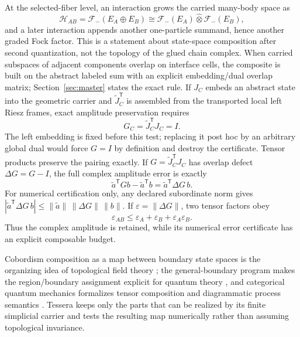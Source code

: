 \documentclass[11pt,letterpaper]{article}
\newcommand{\Fock}{\mathcal{F}_{-}}
\newcommand{\HK}{\mathcal{H}}
\newcommand{\gtens}{\mathbin{\widehat{\otimes}}}
\begin{document}
At the selected-fiber level, an interaction grows the carried many-body space
as
\begin{equation*}
  \HK_{AB}=\Fock(E_A\oplus E_B)
  \cong\Fock(E_A)\gtens\Fock(E_B),
\end{equation*}
and a later interaction appends another one-particle summand, hence another
graded Fock factor. This is a statement about
state-space composition after second quantization, not the topology of the
glued chain complex. When carried subspaces of adjacent components overlap on
interface cells, the composite is built on the abstract labeled sum with an
explicit embedding/dual overlap matrix; Section~\ref{sec:master} states the
exact rule.
If $J_C$ embeds an abstract state into the geometric carrier and
$\widetilde J_C^{\mathsf T}$ is assembled from the transported local left
Riesz frames, exact amplitude preservation requires
\begin{equation*}
  G_C=\widetilde J_C^{\mathsf T}J_C=I.
\end{equation*}
The left embedding is fixed before this test; replacing it post hoc by an
arbitrary global dual would force $G=I$ by definition and destroy the
certificate.
Tensor products preserve the pairing exactly. If
$G=\widetilde J_C^{\mathsf T}J_C$ has overlap defect $\Delta G=G-I$, the full
complex amplitude error is exactly
\begin{equation*}
  \widetilde a^{\mathsf T}Gb-\widetilde a^{\mathsf T}b
  =\widetilde a^{\mathsf T}\Delta G\,b.
\end{equation*}
For numerical certification only, any declared subordinate norm gives
$|\widetilde a^{\mathsf T}\Delta G\,b|
\le\|\widetilde a\|\,\|\Delta G\|\,\|b\|$. If
$\varepsilon=\|\Delta G\|$, two tensor factors obey
\begin{equation*}
  \varepsilon_{AB}\le\varepsilon_{A}+\varepsilon_{B}
    +\varepsilon_{A}\varepsilon_{B}.
\end{equation*}
Thus the complex amplitude is retained, while its numerical error certificate
has an explicit composable budget.

Cobordism composition as a map between boundary state spaces is the organizing
idea of topological field theory \cite{atiyah1988}; the general-boundary
program makes the region/boundary assignment explicit for quantum theory
\cite{oeckl2003}, and categorical quantum mechanics formalizes tensor
composition and diagrammatic process semantics \cite{abramskycoecke2004}.
Tessera keeps only the parts that can be realized by its finite simplicial
carrier and tests the resulting map numerically rather than assuming
topological invariance.
\end{document}
